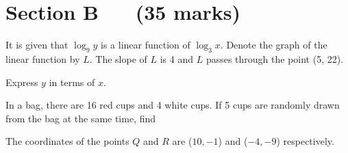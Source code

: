 \documentclass[11pt,paper=a4,answers]{exam}
\begin{document}
\newpage
\section*{Section B ~~ (35 marks)}
    \marksnotpoints
\begin{questions}
    \setcounter{question}{14}

    \label{Q15: Log graph}
    \question[3]
        It is given that $\displaystyle \log_{9}y$ is a linear function of $\displaystyle \log_{3}x$. Denote the graph of the linear function by $L$.
        The slope of $L$ is 4 and $L$ passes through the point (5, 22).
        
        \vspace{0.2cm}
        Express $y$ in terms of $x$. \droppoints

    \vspace{0.5cm}
    \label{Q16: Permutation and combination}
    \question
        In a bag, there are 16 red cups and 4 white cups. If 5 cups are randomly drawn from the bag at the same time, find

    \vspace{0.5cm}
    \label{Q17: Locus and circle}
    \question
        The coordinates of the points $Q$ and $R$ are ($10, -1$) and ($-4, -9$) respectively.
\end{questions}
\end{document}
